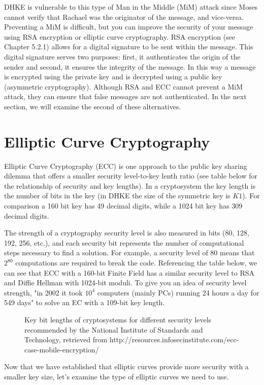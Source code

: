 DHKE is vulnerable to this type of Man in the Middle (MiM) attack since Moses cannot verify that Rachael was the originator of the message, and vice-versa.  Preventing a MiM is difficult, but you can improve the security of your message using RSA encryption or elliptic curve cryptography.  RSA encryption (see Chapter 5.2.1) allows for a digital signature to be sent within the message. This digital signature serves two purposes: first, it authenticates the origin of the sender and second, it ensures the integrity of the message. In this way a message is encrypted using the private key and is decrypted using a public key (asymmetric cryptography). Although RSA and ECC cannot prevent a MiM attack, they can ensure that false messages are not authenticated. In the next section, we will examine the second of these alternatives. 

\section{Elliptic Curve Cryptography}\label{sec:ECC:2}

Elliptic Curve Cryptography (ECC) is one approach to the public key sharing dilemma that offers a smaller security level-to-key lenth ratio (see table below for the relationship  of security and key lengths).  In a cryptosystem the key length is the number of bits in the key (in DHKE the size of the symmetric key is $K1$).  For comparison a 160 bit key has 49 decimal digits, while a 1024 bit key has 309 decimal digits. 

The strength of a cryptography security level is also measured in bits (80, 128, 192, 256, etc.), and each security bit represents the number of computational steps necessary to find a solution.  For example, a security level of 80 means that $2^{80}$ computations are required to break the code. Referencing the table below, we can see that ECC with a 160-bit Finite Field has a similar security level to RSA and Diffie Hellman with 1024-bit moduli. To give you an idea of security level strength, "in 2002 it took $10^4$ computers (mainly PCs) running 24 hours a day for 549 days" to solve an EC with a 109-bit key length. 
\begin{figure} [H]
	  \caption{\label{fig:DH:DHKE_9} Key bit lengths of cryptosystems for different security levels recommended by the National Institute of Standards and Technology, retrieved from http://resources.infosecinstitute.com/ecc-case-mobile-encryption/}
\end{figure}
Now that we have established that elliptic curves provide more security with a smaller key size, let's examine the type of elliptic curves we need to use.

